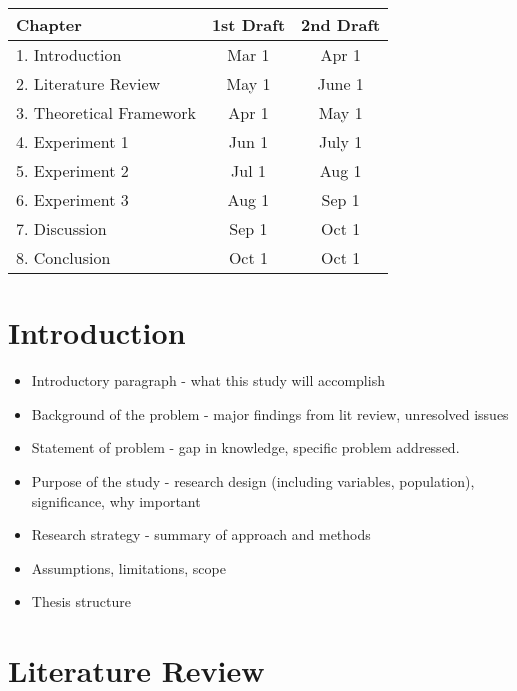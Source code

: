 \def\baselevelheader{0}


  \begin{tabular}{ | l || c | c | }
    \hline
    Chapter & 1st Draft & 2nd Draft \\ \hline
    1. Introduction & Mar 1 & Apr 1 \\ \hline
    2. Literature Review & May 1 &  June 1 \\ \hline
    3. Theoretical Framework & Apr 1 &  May 1 \\ \hline
    4. Experiment 1 & Jun 1 & July 1 \\ \hline
    5. Experiment 2 & Jul 1 & Aug 1 \\ \hline
    6. Experiment 3 & Aug 1 & Sep 1 \\ \hline
    7. Discussion & Sep 1 & Oct 1 \\ \hline
    8. Conclusion & Oct 1 & Oct 1 \\ \hline
  \end{tabular}


\section{Introduction}
\label{introduction}

\begin{itemize}
\item Introductory paragraph - what this study will accomplish

\item Background of the problem - major findings from lit review, unresolved issues

\item Statement of problem - gap in knowledge, specific problem addressed.

\item Purpose of the study - research design (including variables, population), significance, why important

\item Research strategy - summary of approach and methods

\item Assumptions, limitations, scope

\item Thesis structure

\end{itemize}

\section{Literature Review}
\label{literaturereview}


